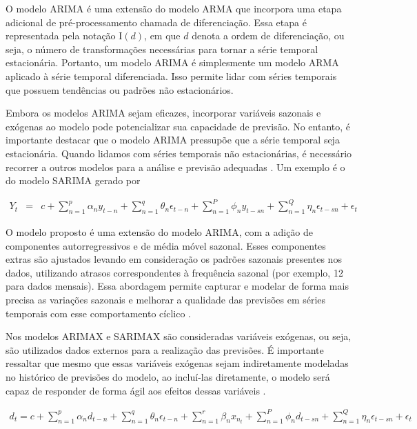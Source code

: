  O modelo ARIMA é uma extensão do modelo ARMA que incorpora uma etapa adicional de pré-processamento chamada de diferenciação. Essa etapa é representada pela notação I$(d)$, em que $d$ denota a ordem de diferenciação, ou seja, o número de transformações necessárias para tornar a série temporal estacionária. Portanto, um modelo ARIMA é simplesmente um modelo ARMA aplicado à série temporal diferenciada. Isso permite lidar com séries temporais que possuem tendências ou padrões não estacionários.
 
 Embora os modelos ARIMA sejam eficazes, incorporar variáveis sazonais e exógenas ao modelo pode potencializar sua capacidade de previsão. No entanto, é importante destacar que o modelo ARIMA pressupõe que a série temporal seja estacionária. Quando lidamos com séries temporais não estacionárias, é necessário recorrer a outros modelos para a análise e previsão adequadas  \cite{arima}. Um exemplo é o do modelo SARIMA gerado por
 
 \begin{eqnarray}
 	Y_t&=&c+\sum_{n=1}^p \alpha_n y_{t-n}+\sum_{n=1}^q \theta_n \epsilon_{t-n}+\sum_{n=1}^P \phi_n y_{t-s n}+\sum_{n=1}^Q \eta_n \epsilon_{t-s n}+\epsilon_t \label{sarima}
 \end{eqnarray}
 
 O modelo proposto é uma extensão do modelo ARIMA, com a adição de componentes autorregressivos e de média móvel sazonal. Esses componentes extras são ajustados levando em consideração os padrões sazonais presentes nos dados, utilizando atrasos correspondentes à frequência sazonal (por exemplo, 12 para dados mensais). Essa abordagem permite capturar e modelar de forma mais precisa as variações sazonais e melhorar a qualidade das previsões em séries temporais com esse comportamento cíclico \cite{sarima}.
 
 Nos modelos ARIMAX e SARIMAX são consideradas variáveis exógenas, ou seja, são utilizados dados externos para a realização das previsões. É importante ressaltar que mesmo que essas variáveis exógenas sejam indiretamente modeladas no histórico de previsões do modelo, ao incluí-las diretamente, o modelo será capaz de responder de forma ágil aos efeitos dessas variáveis \cite{sarima}.
 
 \begin{eqnarray}
 	d_t=c+\sum_{n=1}^p \alpha_n d_{t-n}+\sum_{n=1}^q \theta_n \epsilon_{t-n}+\sum_{n=1}^r \beta_n x_{n_t}+\sum_{n=1}^P \phi_n d_{t-s n}+\sum_{n=1}^Q \eta_n \epsilon_{t-s n}+\epsilon_t \label{eq:sarmax}
 \end{eqnarray}
 

